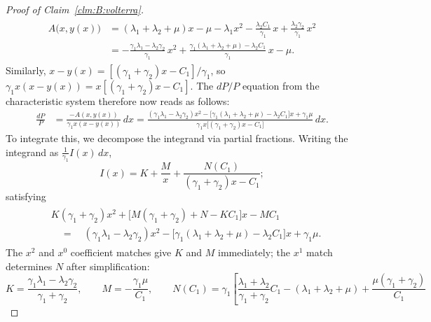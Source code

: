 \begin{proof}[Proof of Claim~\ref{clm:B:volterra}]
\begin{align*}
        \begin{split}
        A\bigl(x,y(x)\bigr)
        &= (\lambda_1+\lambda_2+\mu)x - \mu - \lambda_1 x^2
           - \frac{\lambda_2 C_1}{\gamma_1}\,x + \frac{\lambda_2\gamma_2}{\gamma_1}\,x^2 \\
        &= -\frac{\gamma_1\lambda_1-\lambda_2\gamma_2}{\gamma_1}\,x^2
           + \frac{\gamma_1(\lambda_1+\lambda_2+\mu)-\lambda_2 C_1}{\gamma_1}\,x
           - \mu.
        \end{split}
    \end{align*}
    Similarly, $x - y(x) = [(\gamma_1+\gamma_2)x-C_1]/\gamma_1$, so $\gamma_1 x(x-y(x)) = x[(\gamma_1+\gamma_2)x-C_1]$.  The $dP/P$ equation from the characteristic system therefore now reads as follows:
    \begin{align*}
        \frac{dP}{P}
        &= \frac{-A(x,y(x))}{\gamma_1 x(x-y(x))}\,dx
         = \frac{(\gamma_1\lambda_1 - \lambda_2\gamma_2)x^2
                 - \bigl[\gamma_1(\lambda_1+\lambda_2+\mu) - \lambda_2 C_1\bigr]x
                 + \gamma_1\mu}
                {\gamma_1 x\bigl[(\gamma_1+\gamma_2)x - C_1\bigr]}\,dx.
    \end{align*}
    To integrate this, we decompose the integrand via partial fractions. Writing the integrand as $\tfrac{1}{\gamma_1}I(x)\,dx$,
    \begin{equation*}
             I(x) = K + \frac{M}{x} + \frac{N(C_1)}{(\gamma_1+\gamma_2)x - C_1};
    \end{equation*}
    satisfying    
    \begin{align*}
        \begin{split}
             &K(\gamma_1+\gamma_2)x^2
              + \bigl[M(\gamma_1+\gamma_2)+N-KC_1\bigr]x - MC_1 \\
             &\quad = \quad (\gamma_1\lambda_1-\lambda_2\gamma_2)x^2
             - \bigl[\gamma_1(\lambda_1+\lambda_2+\mu)-\lambda_2 C_1\bigr]x
              + \gamma_1\mu.
        \end{split}
    \end{align*}
    The $x^2$ and $x^0$ coefficient matches give $K$ and $M$ immediately; the $x^1$ match determines $N$ after simplification:
    \begin{equation}
        K = \frac{\gamma_1\lambda_1 - \lambda_2\gamma_2}{\gamma_1+\gamma_2},
        \qquad
        M = -\frac{\gamma_1\mu}{C_1},
        \qquad
        N(C_1) = \gamma_1\!\left[
            \frac{\lambda_1+\lambda_2}{\gamma_1+\gamma_2}C_1
            - (\lambda_1+\lambda_2+\mu)
            + \frac{\mu(\gamma_1+\gamma_2)}{C_1}

\end{equation}
\end{proof}
